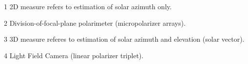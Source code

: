 \begin{table*}
{\begin{threeparttable}
{\begin{tabular}{l c ccc c}
\bottomrule
\end{tabular}}
\label{tab:survey-tab}
\begin{tablenotes}
\item[1] 2D measure refers to estimation of solar azimuth only. 
\item[2] Division-of-focal-plane polarimeter (micropolarizer arrays).
\item[3] 3D measure referes to estimation of solar azimuth and elevation (solar vector).
\item[4] Light Field Camera (linear polarizer triplet).
\end{tablenotes}
\end{threeparttable}}
\end{table*}




